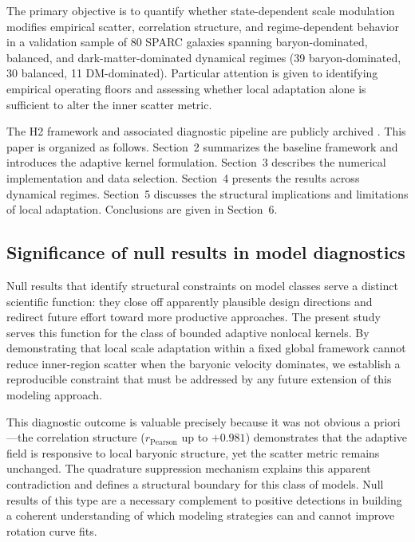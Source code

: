 \documentclass[twocolumn,linenumbers]{aastex701}
\begin{document}
The primary objective is to quantify whether state-dependent scale modulation
modifies empirical scatter, correlation structure, and regime-dependent
behavior in a validation sample of 80 SPARC galaxies spanning baryon-dominated,
balanced, and dark-matter-dominated dynamical regimes (39 baryon-dominated,
30 balanced, 11 DM-dominated). Particular attention is given to identifying
empirical operating floors and assessing whether local adaptation alone is
sufficient to alter the inner scatter metric.

The H2 framework and associated diagnostic pipeline are publicly archived
\citep{h2model2026}. This paper is organized as follows. Section~2
summarizes the baseline framework and introduces the adaptive kernel
formulation. Section~3 describes the numerical implementation and data
selection. Section~4 presents the results across dynamical regimes.
Section~5 discusses the structural implications and limitations of local
adaptation. Conclusions are given in Section~6.

\subsection{Significance of null results in model diagnostics}
\label{subsec:null_significance}

Null results that identify structural constraints on model classes serve a
distinct scientific function: they close off apparently plausible design
directions and redirect future effort toward more productive approaches.
The present study serves this function for the class of bounded adaptive
nonlocal kernels. By demonstrating that local scale adaptation within a
fixed global framework cannot reduce inner-region scatter when the baryonic
velocity dominates, we establish a reproducible constraint that must be
addressed by any future extension of this modeling approach.

This diagnostic outcome is valuable precisely because it was not obvious a
priori---the correlation structure ($r_{\mathrm{Pearson}}$ up to $+0.981$)
demonstrates that the adaptive field is responsive to local baryonic
structure, yet the scatter metric remains unchanged. The quadrature
suppression mechanism explains this apparent contradiction and defines a
structural boundary for this class of models. Null results of this type
are a necessary complement to positive detections in building a coherent
understanding of which modeling strategies can and cannot improve rotation
curve fits.
\end{document}
